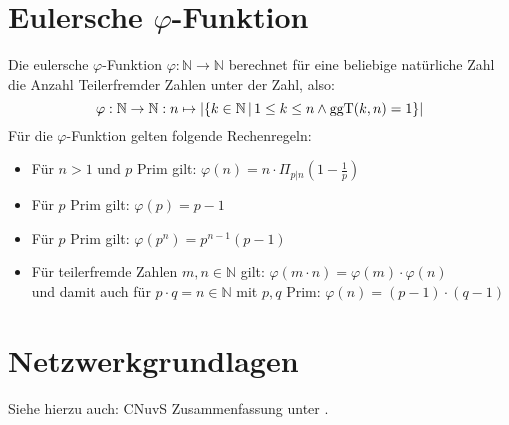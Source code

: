     \section{Eulersche \(\varphi\)-Funktion}
        Die eulersche \(\varphi\)-Funktion \( \varphi : \mathbb{N} \rightarrow \mathbb{N} \) berechnet für eine beliebige natürliche Zahl die Anzahl Teilerfremder Zahlen unter der Zahl, also:
        \begin{equation*}
	        \varphi : \mathbb{N} \rightarrow \mathbb{N} : n \mapsto \lvert \{ k \in \mathbb{N} \,\vert\, 1 \leq k \leq n \land \textrm{ggT}(k, n) = 1 \} \rvert
        \end{equation*}
        Für die \(\varphi\)-Funktion gelten folgende Rechenregeln:
        \begin{itemize}
        	\item Für \(n > 1\) und \(p\) Prim gilt: \tabto{4.7cm} \( \varphi(n) = n \cdot \Pi_{p \vert n} (1 - \frac{1}{p}) \)
        	\item Für \(p\) Prim gilt: \tabto{4.7cm} \( \varphi(p) = p - 1 \)
        	\item Für \(p\) Prim gilt: \tabto{4.7cm} \( \varphi(p^n) = p^{n-1}(p-1) \)
        	\item Für teilerfremde Zahlen \( m, n \in \mathbb{N} \) gilt: \tabto{8.2cm} \( \varphi(m \cdot n) = \varphi(m) \cdot \varphi(n) \) \\
        	      und damit auch für \(p \cdot q = n \in \mathbb{N} \) mit \(p,q\) Prim: \tabto{8.2cm} \( \varphi(n) = (p - 1) \cdot (q - 1) \)
        \end{itemize}

    \section{Netzwerkgrundlagen}
        Siehe hierzu auch: CNuvS Zusammenfassung unter .
    
